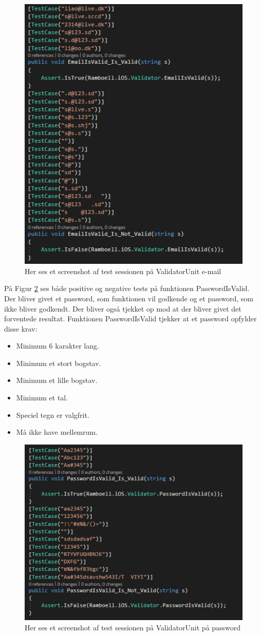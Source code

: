 \begin{figure}[H]
	\centering
	\includegraphics[width=0.6\linewidth]{Unit/ValidatorUnitEmail.PNG}
	\caption{Her ses et screenshot af test sessionen på ValidatorUnit e-mail}
	\label{fig:ValidatorUnitEmail}
\end{figure}

\clearpage

På Figur \ref{fig:ValidatorUnitPassword} ses både positive og negative tests på funktionen PasswordIsValid. Der bliver givet et password, som funktionen vil godkende og et password, som ikke bliver godkendt. Der bliver også tjekket op mod at der bliver givet det forventede resultat. Funktionen PasswordIsValid tjekker at et password opfylder disse krav: 
\begin{itemize}
	\item Minimum 6 karakter lang.
	\item Minimum et stort bogstav.
	\item Minimum et lille bogstav.
	\item Minimum et tal.
	\item Speciel tegn er valgfrit.
	\item Må ikke have mellemrum.
\end{itemize}

\begin{figure}[H]
	\centering
	\includegraphics[width=0.6\linewidth]{Unit/ValidatorUnitPassword.PNG}
	\caption{Her ses et screenshot af test sessionen på ValidatorUnit på password}
	\label{fig:ValidatorUnitPassword}
\end{figure}
